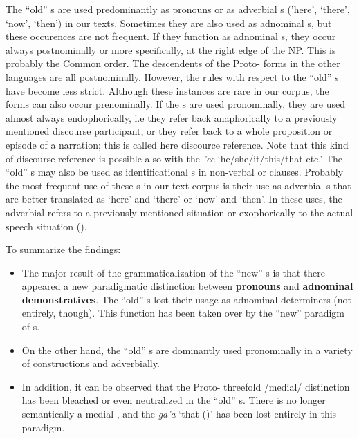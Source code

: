 \documentclass[output=paper]{langsci/langscibook}
\begin{document}
The ``old'' s are used predominantly as  pronouns or as adverbial s ('here', `there', `now', `then') in our texts. Sometimes they are also used as adnominal s, but these occurences are not frequent. 
If they function as adnominal s, they occur always postnominally or more specifically, at the right edge of the NP. This is probably the Common  order. The descendents of the Proto- forms in the other  languages are all postnominally. However, the  rules with respect to the ``old'' s have become less strict. Although these instances are rare in our corpus, the forms can also occur prenominally.
If the s are used pronominally, they are used almost always endophorically, i.e they refer back anaphorically to a previously mentioned discourse participant, or they refer back to a whole proposition or episode of a narration; this is called here discource  reference. Note that this kind of discourse  reference is possible also with the  \textit{'ee} `he/she/it/this/that etc.' 
The ``old'' s may also be used as identificational s in non-verbal or  clauses.
Probably the most frequent use of these s in our text corpus is their use as adverbial s that are better translated as `here' and `there' or `now' and `then'. In these uses, the adverbial  refers to a previously mentioned situation or exophorically to the actual speech situation ().

To summarize the findings:
\begin{itemize}
\item
The major result of the grammaticalization of the ``new'' s is that there appeared a new paradigmatic distinction between \textbf{ pronouns} and \textbf{adnominal demonstratives}. The ``old'' s lost their usage as adnominal determiners (not entirely, though). This function has been taken over by the ``new'' paradigm of s. 
\item
On the other hand, the ``old'' s are dominantly used pronominally in a variety of constructions and adverbially.
\item
In addition, it can be observed that the Proto- threefold \slash medial\slash {} distinction has been bleached or even neutralized in the ``old''  s. There is no longer semantically a medial , and the  \textit{ga'a} `that ()' has been lost entirely in this paradigm.
\end{itemize}
\end{document}
